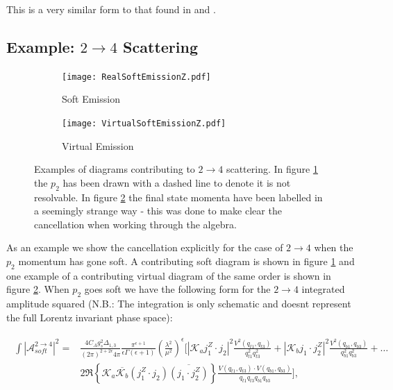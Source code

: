 		This is a very similar form to that found in \cite{Constructing} and \cite{JeppeHiggs}.

	\subsection{Example: $2\rightarrow4$ Scattering}
	\label{sub:2to4Example}

	\begin{figure}[bth!]

		\centering

		\begin{subfigure}[b]{0.5\textwidth}
			\texttt{[image: RealSoftEmissionZ.pdf]}
			\caption{Soft Emission}
			\label{fig:real24}
		\end{subfigure}

		\begin{subfigure}[b]{0.5\textwidth}
			\centering
			\texttt{[image: VirtualSoftEmissionZ.pdf]}
			\caption{Virtual Emission}
			\label{fig:virtual24}
		\end{subfigure}

		\caption{Examples of diagrams contributing to $2\rightarrow4$ scattering.
		In figure \ref{fig:real24} the $p_2$ has been drawn with a dashed line to denote
		it is not resolvable.  In figure \ref{fig:virtual24} the final state momenta have
		been labelled in a seemingly strange way - this was done to make clear the
		cancellation when working through the algebra.}

		\label{fig:2to4}
	\end{figure}

	As an example we show the cancellation explicitly for the case of $2\rightarrow4$ when the
	$p_2$ momentum has gone soft.  A contributing soft diagram is shown in figure \ref{fig:real24} and
	one example of a contributing virtual diagram of the same order is shown in figure \ref{fig:virtual24}.
	When $p_2$ goes soft we have the following form for the $2\rightarrow4$ integrated amplitude squared
	({N.B.}: The integration is only schematic and doesnt represent the full Lorentz invariant phase space):

	\begin{align}
	\begin{split}
		\int|\mathcal{A}^{2\rightarrow4}_{soft}|^2 = &\frac{4C_Ag_s^2\Delta_{1,3}}{(2\pi)^{2+2\epsilon}4\pi}
		\frac{\pi^{\epsilon+1}}{\epsilon\Gamma(\epsilon+1)}
		\left(\frac{\lambda^2}{\mu^2}\right)^\epsilon\Bigg[|\mathcal{K}_aj_1^Z\cdot j_2|^2
		\frac{V^2(q_{t1}, q_{t3})}{q^2_{t1}q^2_{t3}} + |\mathcal{K}_bj_1\cdot j_2^Z|^2
		\frac{V^2(q_{b1}, q_{b3})}{q^2_{b1}q^2_{b3}} + \ldots \\
		& 2\Re\left\{\mathcal{K}_a\overline{\mathcal{K}_b}
		(j_1^Z\cdot j_2)\overline{(j_1\cdot j_2^Z)}\right\} \frac{V(q_{t1}, q_{t3})
		\cdot V(q_{b1}, q_{b3})}{q_{t1}q_{t3}q_{b1}q_{b3}}\Bigg],
	\end{split}
	\end{align}

